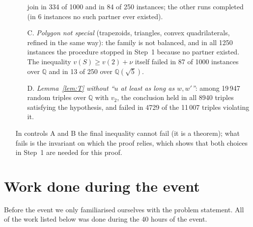 \documentclass[11pt]{article}
\theoremstyle{definition}
\newcommand{\Q}{\mathbb{Q}}
\begin{document}
\begin{enumerate}
\begin{itemize}
join in 334 of 1000 and in 84 of 250 instances; the other runs completed (in 6 instances no such
partner ever existed).
\item[C.] \emph{Polygon not special} (trapezoids, triangles, convex quadrilaterals, refined in the
same way): the family is not balanced, and in all 1250 instances the procedure stopped in Step~1
because no partner existed. The inequality $v(S)\ge v(2)+\nu$ itself failed in 87 of 1000 instances
over $\Q$ and in 13 of 250 over $\Q(\sqrt5)$.
\item[D.] \emph{Lemma~\ref{lem:T} without ``$u$ at least as long as $w,w'$''}: among 19\,947 random
triples over $\Q$ with $v_2$, the conclusion held in all 8940 triples satisfying the hypothesis, and
failed in 4729 of the 11\,007 triples violating it.
\end{itemize}
In controls A and B the final inequality cannot fail (it is a theorem); what fails is the invariant
on which the proof relies, which shows that both choices in Step~1 are needed for this proof.
\end{enumerate}

\section{Work done during the event}\label{sec:event}

Before the event we only familiarised ourselves with the problem statement. All of the work
listed below was done during the 40 hours of the event.
\end{document}
